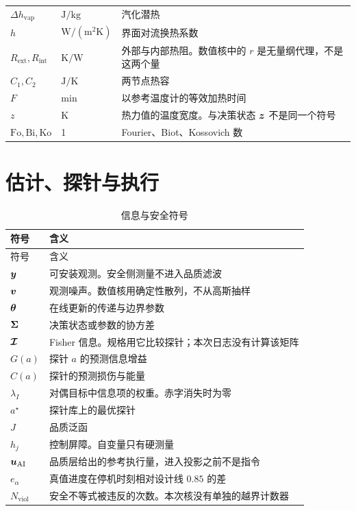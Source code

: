 \begin{longtable}{llp{8.2cm}}
\(\Delta h_{\mathrm{vap}}\) & \(\mathrm{J}/\mathrm{kg}\) & 汽化潜热 \\
\(h\) & \(\mathrm{W}/(\mathrm{m}^2\mathrm{K})\) & 界面对流换热系数 \\
\(R_{\mathrm{ext}},R_{\mathrm{int}}\) & \(\mathrm{K}/\mathrm{W}\) & 外部与内部热阻。数值核中的 \(r\) 是无量纲代理，不是这两个量 \\
\(C_1,C_2\) & \(\mathrm{J}/\mathrm{K}\) & 两节点热容 \\
\(F\) & \(\mathrm{min}\) & 以参考温度计的等效加热时间 \\
\(z\) & \(\mathrm{K}\) & 热力值的温度宽度。与决策状态 \(\bm{z}\) 不是同一个符号 \\
\(\mathrm{Fo},\mathrm{Bi},\mathrm{Ko}\) & 1 & Fourier、Biot、Kossovich 数 \\
\bottomrule
\end{longtable}

\section{估计、探针与执行}

\begin{longtable}{lp{10cm}}
\caption{信息与安全符号}\\
\toprule
符号 & 含义 \\
\midrule
\endfirsthead
\toprule
符号 & 含义 \\
\midrule
\endhead
\(\bm{y}\) & 可安装观测。安全侧测量不进入品质滤波 \\
\(\bm{v}\) & 观测噪声。数值核用确定性散列，不从高斯抽样 \\
\(\bm{\theta}\) & 在线更新的传递与边界参数 \\
\(\bm{\Sigma}\) & 决策状态或参数的协方差 \\
\(\bm{\mathcal{I}}\) & Fisher 信息。规格用它比较探针；本次日志没有计算该矩阵 \\
\(G(a)\) & 探针 \(a\) 的预测信息增益 \\
\(C(a)\) & 探针的预测损伤与能量 \\
\(\lambda_I\) & 对偶目标中信息项的权重。赤字消失时为零 \\
\(a^\star\) & 探针库上的最优探针 \\
\(J\) & 品质泛函 \\
\(h_j\) & 控制屏障。自变量只有硬测量 \\
\(\bm{u}_{\mathrm{AI}}\) & 品质层给出的参考执行量，进入投影之前不是指令 \\
\(e_{\alpha}\) & 真值进度在停机时刻相对设计线 \(0.85\) 的差 \\
\(N_{\mathrm{viol}}\) & 安全不等式被违反的次数。本次核没有单独的越界计数器 \\
\bottomrule
\end{longtable}

